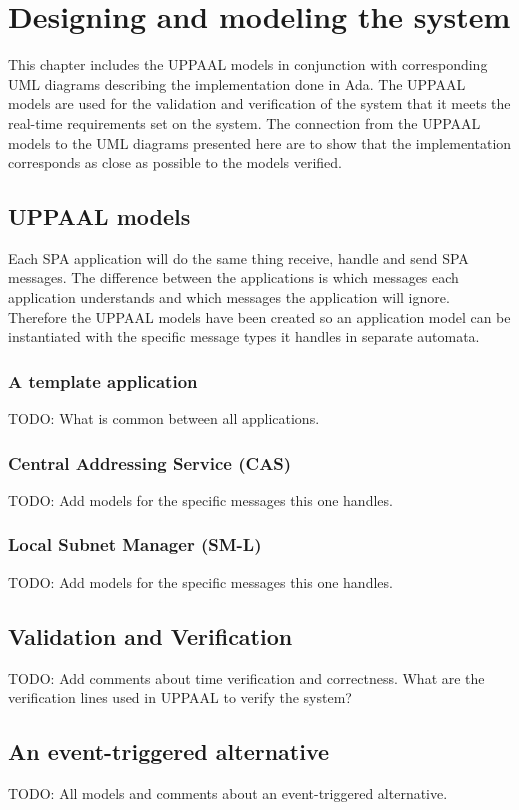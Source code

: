 \chapter{Designing and modeling the system}\label{ch:uppaal_models}
This chapter includes the UPPAAL models in conjunction with corresponding UML
diagrams describing the implementation done in Ada. The UPPAAL models are used
for the validation and verification of the system that it meets the real-time
requirements set on the system. The connection from the UPPAAL models to the
UML diagrams presented here are to show that the implementation corresponds as
close as possible to the models verified.

\section{UPPAAL models}
Each SPA application will do the same thing receive, handle and send SPA
messages. The difference between the applications is which messages each
application understands and which messages the application will ignore.
Therefore the UPPAAL models have been created so an application model can be
instantiated with the specific message types it handles in separate automata.

\subsection{A template application}
TODO: What is common between all applications.

\subsection{Central Addressing Service (CAS)}
TODO: Add models for the specific messages this one handles.

\subsection{Local Subnet Manager (SM-L)}
TODO: Add models for the specific messages this one handles.

\section{Validation and Verification}
TODO: Add comments about time verification and correctness. What are the
verification lines used in UPPAAL to verify the system?

\section{An event-triggered alternative}
TODO: All models and comments about an event-triggered alternative.
